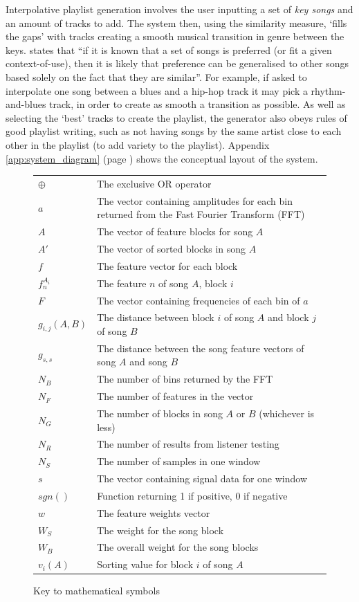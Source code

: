 Interpolative playlist generation involves the user inputting a set of \emph{key songs} and an amount of tracks to add. The system then, using the similarity measure, `fills the gaps' with tracks creating a smooth musical transition in genre between the keys. \citet{Pauws2002} states that ``if it is known that a set of songs is preferred (or fit a given context-of-use), then it is likely that preference can be generalised to other songs based solely on the fact that they are similar''. For example, if asked to interpolate one song between a blues and a hip-hop track it may pick a rhythm-and-blues track, in order to create as smooth a transition as possible. As well as selecting the `best' tracks to create the playlist, the generator also obeys rules of good playlist writing, such as not having songs by the same artist close to each other in the playlist (to add variety to the playlist). Appendix \ref{app:system_diagram} (page \pageref{app:system_diagram}) shows the conceptual layout of the system.
\begin{figure}[ht]
	\caption{Key to mathematical symbols}
	\begin{tabular}{l l}
		$\oplus$		& The exclusive OR operator \\
		$a$				& The vector containing amplitudes for each bin returned from the Fast Fourier Transform (FFT) \\
		$A$				& The vector of feature blocks for song $A$ \\
		$A'$			& The vector of sorted blocks in song $A$ \\
		$f$				& The feature vector for each block \\
		$f_n^{A_{i}}$	& The feature $n$ of song $A$, block $i$ \\
		$F$				& The vector containing frequencies of each bin of $a$ \\
		$g_{i,j}(A,B)$	& The distance between block $i$ of song $A$ and block $j$ of song $B$ \\
		$g_{s,s}$		& The distance between the song feature vectors of song $A$ and song $B$ \\
		$N_B$			& The number of bins returned by the FFT \\
		$N_F$			& The number of features in the vector \\
		$N_G$			& The number of blocks in song $A$ or $B$ (whichever is less) \\
		$N_R$			& The number of results from listener testing \\
		$N_S$			& The number of samples in one window \\
		$s$				& The vector containing signal data for one window \\
		$sgn()$			& Function returning 1 if positive, 0 if negative \\
		$w$				& The feature weights vector \\
		$W_S$			& The weight for the song block \\
		$W_B$			& The overall weight for the song blocks \\
		$v_i(A)$		& Sorting value for block $i$ of song $A$ \\
	\end{tabular}
\end{figure}
